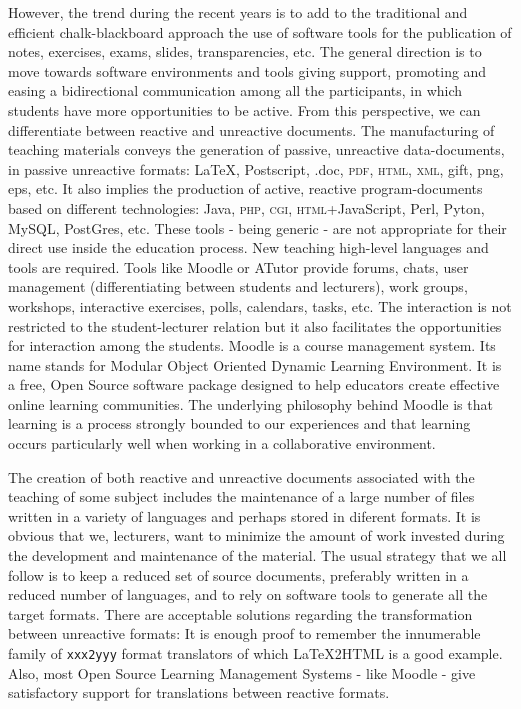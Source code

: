 \documentclass{pracjourn}[2006/02/20]
\begin{document}
However, the trend during the recent years is to add to the
traditional and efficient chalk-blackboard approach the use of software tools 
for the publication of notes, exercises, exams, slides, transparencies, etc.
The general direction is to move towards software environments and tools
giving support, promoting and easing
a bidirectional communication among all the participants, in which 
students have more opportunities to be active.
From this perspective, we can differentiate between 
reactive and unreactive documents. 
The manufacturing of teaching materials conveys the generation
of passive, unreactive data-documents, in passive unreactive formats:
\LaTeX{}, Postscript, .doc, 
\textsc{pdf}, \textsc{html}, \textsc{xml}, gift,
png, eps, etc.
It also implies the production of active, reactive program-documents
based on different technologies:
Java, \textsc{php}, \textsc{cgi}, \textsc{html}+JavaScript, 
Perl, Pyton, MySQL, PostGres, etc. 
These tools - being generic - are not appropriate for their direct use
inside the education process. New teaching high-level languages and tools 
are required. Tools like
Moodle \cite{url:mod,url:modwikip,moodle:guide} or ATutor \cite{url:atu}
provide forums, chats, user management
(differentiating between students and lecturers), 
work groups, workshops, interactive exercises, polls, calendars,
tasks, etc.
The interaction is not restricted to the student-lecturer relation but
it also facilitates the opportunities for interaction among the students.
Moodle is a course management system.   
Its name stands for Modular Object Oriented
Dynamic Learning Environment.
It is a free, Open Source software package designed 
to help educators create effective online
learning communities. The underlying philosophy behind Moodle
is that learning is a process strongly bounded
to our experiences and that learning occurs particularly 
well when working in a collaborative environment.

The creation of both reactive and unreactive documents associated
with the teaching of some subject includes the maintenance
of a large number of files written in a variety of languages
and perhaps stored in diferent formats.
It is obvious that  we, lecturers,  want to minimize the amount of work invested 
during the development and maintenance of the material.
The usual strategy that we all follow is to keep a reduced set of source documents, 
preferably written in a reduced number of languages, and to rely on software tools 
to generate all the target formats. There are acceptable 
solutions regarding the transformation between unreactive formats: 
It is enough proof to remember the innumerable family of \verb|xxx2yyy| 
format translators of which \LaTeX2HTML{} is a good example.
Also, most Open Source Learning Management Systems - like Moodle -
give satisfactory support for translations between
reactive formats. 
\end{document}
